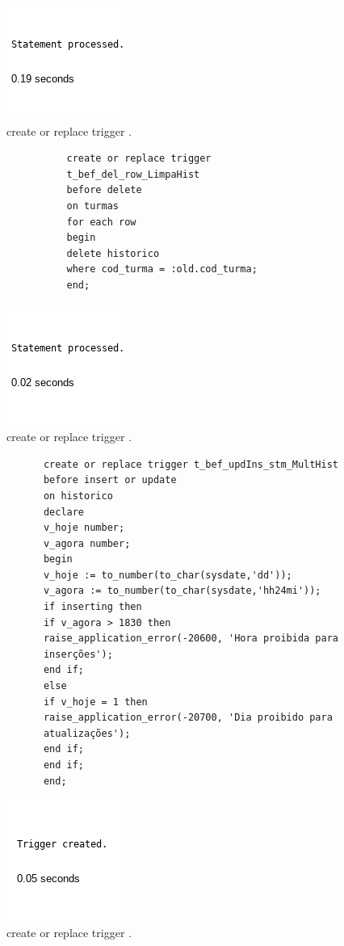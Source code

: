 \documentclass[
article,			%
11pt,				%
oneside,			%
a4paper,			%
english,			%
brazil,				%
sumario=tradicional
]{abntex2}
\begin{document}
\begin{enumerate}
					\begin{center}
						\begin{figure}[H]
							\centering
							\includegraphics[scale=0.5]{./imagens/33.png}
							\caption{	create or replace trigger .}
							\label{rota-1}
						\end{figure}
					\end{center}
									\begin{verbatim}
				create or replace trigger
				t_bef_del_row_LimpaHist
				before delete
				on turmas
				for each row
				begin
				delete historico
				where cod_turma = :old.cod_turma;
				end;
					\end{verbatim}
					\begin{center}
						\begin{figure}[H]
							\centering
							\includegraphics[scale=0.5]{./imagens/34.png}
							\caption{	create or replace trigger .}
							\label{rota-1}
						\end{figure}
					\end{center}
											\begin{verbatim}
			create or replace trigger t_bef_updIns_stm_MultHist
			before insert or update
			on historico
			declare
			v_hoje number;
			v_agora number;
			begin
			v_hoje := to_number(to_char(sysdate,'dd'));
			v_agora := to_number(to_char(sysdate,'hh24mi'));
			if inserting then
			if v_agora > 1830 then
			raise_application_error(-20600, 'Hora proibida para
			inserções');
			end if;
			else
			if v_hoje = 1 then
			raise_application_error(-20700, 'Dia proibido para
			atualizações');
			end if;
			end if;
			end;
				\end{verbatim}
				\begin{center}
					\begin{figure}[H]
						\centering
						\includegraphics[scale=0.5]{./imagens/35.png}
						\caption{	create or replace trigger .}
						\label{rota-1}
					\end{figure}
				\end{center}
			

\end{enumerate}
\end{document}
